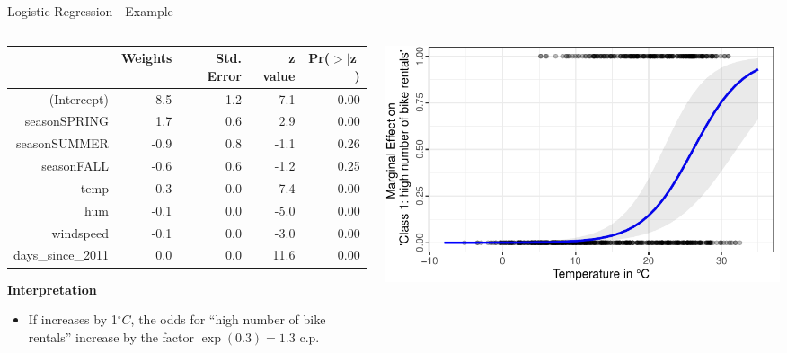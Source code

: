 \documentclass[11pt,compress,t,notes=noshow, aspectratio=169, xcolor=table]{beamer}
\begin{document}
\begin{frame}{Logistic Regression - Example}
\begin{columns}[T]
\begin{column}{0.45\textwidth}
\begin{table}[ht]
\centering
\tiny
\begin{tabular}{rrrrr}
  \hline
 & Weights & Std. Error & z value & Pr($>$$|$z$|$) \\ 
  \hline
(Intercept) & -8.5 & 1.2 & -7.1 & 0.00 \\ 
  seasonSPRING & 1.7 & 0.6 & 2.9 & 0.00 \\ 
  seasonSUMMER & -0.9 & 0.8 & -1.1 & 0.26 \\ 
  seasonFALL & -0.6 & 0.6 & -1.2 & 0.25 \\ 
  temp & 0.3 & 0.0 & 7.4 & 0.00 \\ 
  hum & -0.1 & 0.0 & -5.0 & 0.00 \\ 
  windspeed & -0.1 & 0.0 & -3.0 & 0.00 \\ 
  days\_since\_2011 & 0.0 & 0.0 & 11.6 & 0.00 \\ 
   \hline
\end{tabular}
\end{table}
\pause
\textbf{Interpretation}
\begin{itemize}
    \item If  increases by 1$^\circ C$, the odds for ``high number of bike rentals'' increase by the factor $\exp (0.3) = 1.3$ c.p.
\end{itemize}
\end{column}
\hfill
\pause
\begin{column}{0.5\textwidth}
\includegraphics[width = \textwidth]{figure/logistic_marginal_temp.pdf}
\end{column}
\end{columns}

\end{frame}
\end{document}
